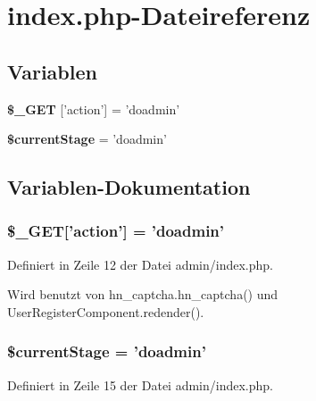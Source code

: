 \section{index.php-Dateireferenz}
\label{admin_2index_8php}
\subsection*{Variablen}
\begin{CompactItemize}
\item 
{\bf \$\_\-GET} ['action'] = 'doadmin'
\item 
{\bf \$currentStage} = 'doadmin'
\end{CompactItemize}


\subsection{Variablen-Dokumentation}
\subsubsection{\setlength{\rightskip}{0pt plus 5cm}\$\_\-GET['action'] = 'doadmin'}\label{admin_2index_8php_adfe36d0024c98a104c6592111fa6669}




Definiert in Zeile 12 der Datei admin/index.php.

Wird benutzt von hn\_\-captcha.hn\_\-captcha() und UserRegisterComponent.redender().
\subsubsection{\setlength{\rightskip}{0pt plus 5cm}\$currentStage = 'doadmin'}\label{admin_2index_8php_9d1c6ab193850ee07d0443d7751d3adf}




Definiert in Zeile 15 der Datei admin/index.php.